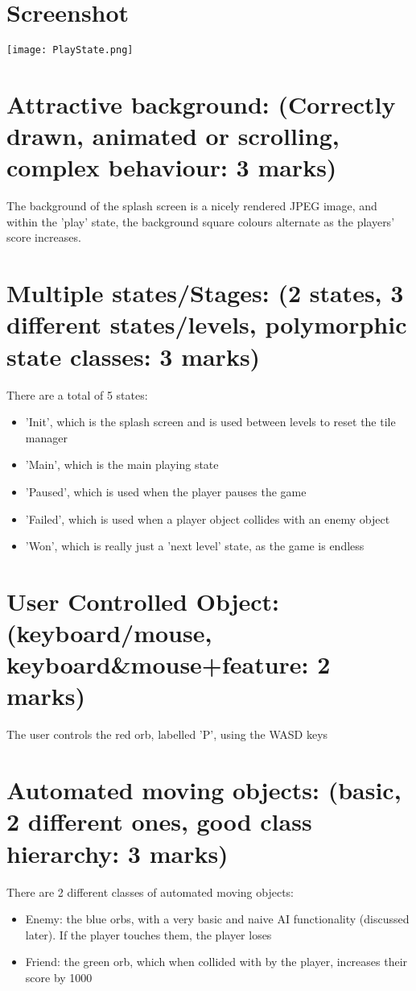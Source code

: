 \documentclass[10pt]{report}
\date{}
\begin{document}
\section{Screenshot}
\texttt{[image: PlayState.png]}
\section{Attractive background: (Correctly drawn, animated or scrolling, complex behaviour: 3 marks)}
The background of the splash screen is a nicely rendered JPEG image, and within the 'play' state, the background square
colours alternate as the players' score increases.
\vspace{5cm}
\section{Multiple states/Stages: (2 states, 3 different states/levels, polymorphic state classes: 3 marks)}
There are a total of 5 states: 
\begin{itemize}
  \item'Init', which is the splash screen and is used between levels to reset the tile manager
  \item'Main', which is the main playing state
  \item'Paused', which is used when the player pauses the game
  \item'Failed', which is used when a player object collides with an enemy object
  \item'Won', which is really just a 'next level' state, as the game is endless
\end{itemize}
\vspace{5cm}
\section{User Controlled Object: (keyboard/mouse, keyboard\&mouse+feature: 2 marks)}
The user controls the red orb, labelled 'P', using the WASD keys
\vspace{5cm}
\section{Automated moving objects: (basic, 2 different ones, good class hierarchy: 3 marks)}
There are 2 different classes of automated moving objects:
\begin{itemize}
  \item Enemy: the blue orbs, with a very basic and naive AI functionality (discussed later). If the player touches them,
    the player loses
  \item Friend: the green orb, which when collided with by the player, increases their score by 1000
\end{itemize}
\vspace{5cm}
\end{document}
